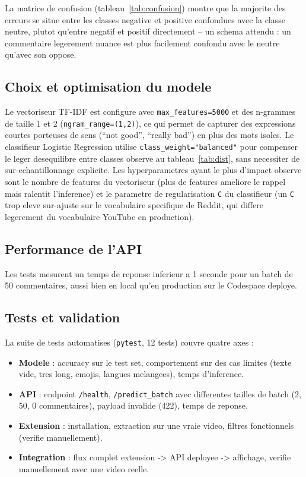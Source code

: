 \documentclass[11pt,a4paper]{article}
\begin{document}
La matrice de confusion (tableau~\ref{tab:confusion}) montre que la majorite des erreurs se situe entre les classes negative et positive confondues avec la classe neutre, plutot qu'entre negatif et positif directement -- un schema attendu : un commentaire legerement nuance est plus facilement confondu avec le neutre qu'avec son oppose.

\subsection{Choix et optimisation du modele}

Le vectoriseur TF-IDF est configure avec \texttt{max\_features=5000} et des n-grammes de taille 1 et 2 (\texttt{ngram\_range=(1,2)}), ce qui permet de capturer des expressions courtes porteuses de sens (``not good'', ``really bad'') en plus des mots isoles. Le classifieur Logistic Regression utilise \texttt{class\_weight="balanced"} pour compenser le leger desequilibre entre classes observe au tableau~\ref{tab:dist}, sans necessiter de sur-echantillonnage explicite. Les hyperparametres ayant le plus d'impact observe sont le nombre de features du vectoriseur (plus de features ameliore le rappel mais ralentit l'inference) et le parametre de regularisation \texttt{C} du classifieur (un \texttt{C} trop eleve sur-ajuste sur le vocabulaire specifique de Reddit, qui differe legerement du vocabulaire YouTube en production).

\subsection{Performance de l'API}

Les tests mesurent un temps de reponse inferieur a 1 seconde pour un batch de 50 commentaires, aussi bien en local qu'en production sur le Codespace deploye.

\subsection{Tests et validation}
\label{sec:tests}

La suite de tests automatises (\texttt{pytest}, 12 tests) couvre quatre axes :

\begin{itemize}
  \item \textbf{Modele} : accuracy sur le test set, comportement sur des cas limites (texte vide, tres long, emojis, langues melangees), temps d'inference.
  \item \textbf{API} : endpoint \texttt{/health}, \texttt{/predict\_batch} avec differentes tailles de batch (2, 50, 0 commentaires), payload invalide (422), temps de reponse.
  \item \textbf{Extension} : installation, extraction sur une vraie video, filtres fonctionnels (verifie manuellement).
  \item \textbf{Integration} : flux complet extension -> API deployee -> affichage, verifie manuellement avec une video reelle.
\end{itemize}
\end{document}
